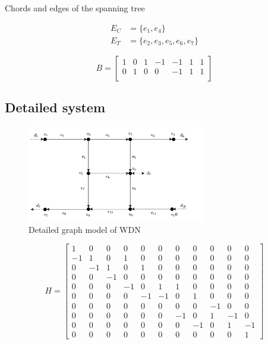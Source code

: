 Chords and edges of the spanning tree

\begin{equation*} 
	\begin{split}
		E_{C} &= \{e_{1},e_{4}\}   \\ E_{T} &= \{e_2,e_3,e_5,e_6,e_7\}
	\end{split}
\end{equation*}


\begin{equation}
	B = \begin{bmatrix}
		1 & 0 & 1 & -1 & -1 & 1 & 1\\
		0 & 1 & 0 & 0 & -1 & 1 & 1\\
	\end{bmatrix}
\end{equation}
\newpage

\subsection{Detailed system}

\begin{figure}[h]
	\centering
	\includegraphics[width=0.7\textwidth]{Pictures/GraphDetailed.png}
	\caption{Detailed graph model of WDN} 
		\label{fig:WDNDetailed}
	\end{figure}
	
	\begin{equation}
		H = \begin{bmatrix}
			1 & 0 & 0   & 0  & 0  & 0  & 0  & 0  & 0  & 0  & 0 \\
			-1 & 1 & 0  & 1  & 0  & 0  & 0  & 0  & 0  & 0  & 0 \\
			0 & -1 & 1  & 0  & 1  & 0  & 0  & 0  & 0  & 0  & 0 \\
			0 & 0  & -1 & 0  & 0  & 0  & 0  & 0  & 0  & 0  & 0 \\
			0 & 0  & 0  & -1 & 0  & 1  & 1  & 0  & 0  & 0  & 0 \\
			0 & 0  & 0  & 0  & -1 & -1 & 0  & 1  & 0  & 0  & 0 \\
			0 & 0  & 0  & 0  & 0  & 0  & 0  & 0  & -1 & 0  & 0 \\
			0 & 0  & 0  & 0  & 0  & 0  & -1 & 0  & 1  & -1 & 0 \\
			0 & 0  & 0  & 0  & 0  & 0  & 0  & -1 & 0  & 1  & -1 \\
			0 & 0  & 0  & 0  & 0  & 0  & 0  & 0  & 0  & 0  & 1 
		\end{bmatrix}
	\end{equation}	
	
